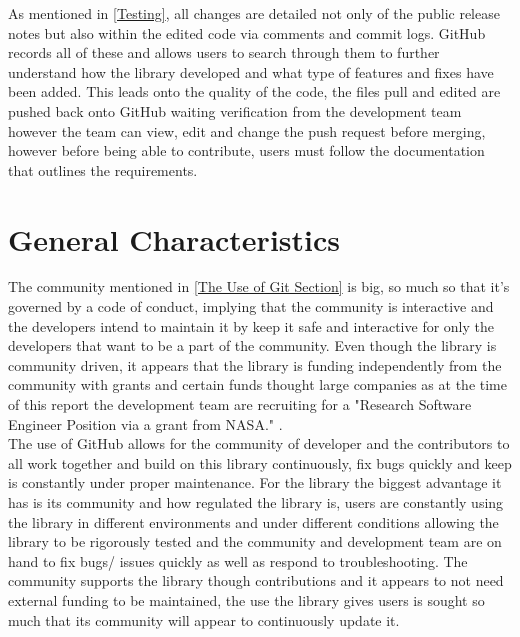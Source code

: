 \documentclass[12pt, a4paper]{article}
\begin{document}
As mentioned in \cref{Testing}, all changes are detailed not only of the public release notes but also within the edited code via comments and commit logs. GitHub records all of these and allows users to search through them to further understand how the library developed and what type of features and fixes have been added. This leads onto the quality of the code, the files pull and edited are pushed back onto GitHub waiting verification from the development team however the team can view, edit and change the push request before merging, however before being able to contribute, users must follow the documentation that outlines the requirements.

\section{General Characteristics}
\label{General Characteristics Section}

The community mentioned in \cref{The Use of Git Section} is big, so much so that it's governed by a code of conduct, implying that the community is interactive and the developers intend to maintain it by keep it safe and interactive for only the developers that want to be a part of the community. Even though the library is community driven, it appears that the library is funding independently from the community with grants and certain funds thought large companies as at the time of this report the development team are recruiting for a "Research Software Engineer Position via a grant from NASA." \cite{Contri}. \\

The use of GitHub allows for the community of developer and the contributors to all work together and build on this library continuously, fix bugs quickly and keep is constantly under proper maintenance. For the library the biggest advantage it has is its community and how regulated the library is, users are constantly using the library in different environments and under different conditions allowing the library to be rigorously tested and the community and development team are on hand to fix bugs/ issues quickly as well as respond to troubleshooting. The community supports the library though contributions and it appears to not need external funding to be maintained, the use the library gives users is sought so much that its community will appear to continuously update it.

\newpage


\end{document}
